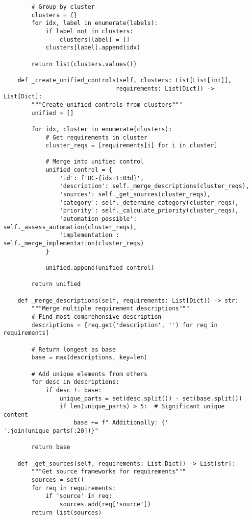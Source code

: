 \begin{verbatim}
        # Group by cluster
        clusters = {}
        for idx, label in enumerate(labels):
            if label not in clusters:
                clusters[label] = []
            clusters[label].append(idx)
        
        return list(clusters.values())
    
    def _create_unified_controls(self, clusters: List[List[int]], 
                                requirements: List[Dict]) -> List[Dict]:
        """Create unified controls from clusters"""
        unified = []
        
        for idx, cluster in enumerate(clusters):
            # Get requirements in cluster
            cluster_reqs = [requirements[i] for i in cluster]
            
            # Merge into unified control
            unified_control = {
                'id': f'UC-{idx+1:03d}',
                'description': self._merge_descriptions(cluster_reqs),
                'sources': self._get_sources(cluster_reqs),
                'category': self._determine_category(cluster_reqs),
                'priority': self._calculate_priority(cluster_reqs),
                'automation_possible': self._assess_automation(cluster_reqs),
                'implementation': self._merge_implementation(cluster_reqs)
            }
            
            unified.append(unified_control)
        
        return unified
    
    def _merge_descriptions(self, requirements: List[Dict]) -> str:
        """Merge multiple requirement descriptions"""
        # Find most comprehensive description
        descriptions = [req.get('description', '') for req in requirements]
        
        # Return longest as base
        base = max(descriptions, key=len)
        
        # Add unique elements from others
        for desc in descriptions:
            if desc != base:
                unique_parts = set(desc.split()) - set(base.split())
                if len(unique_parts) > 5:  # Significant unique content
                    base += f" Additionally: {' '.join(unique_parts[:20])}"
        
        return base
    
    def _get_sources(self, requirements: List[Dict]) -> List[str]:
        """Get source frameworks for requirements"""
        sources = set()
        for req in requirements:
            if 'source' in req:
                sources.add(req['source'])
        return list(sources)
    

\end{verbatim}
